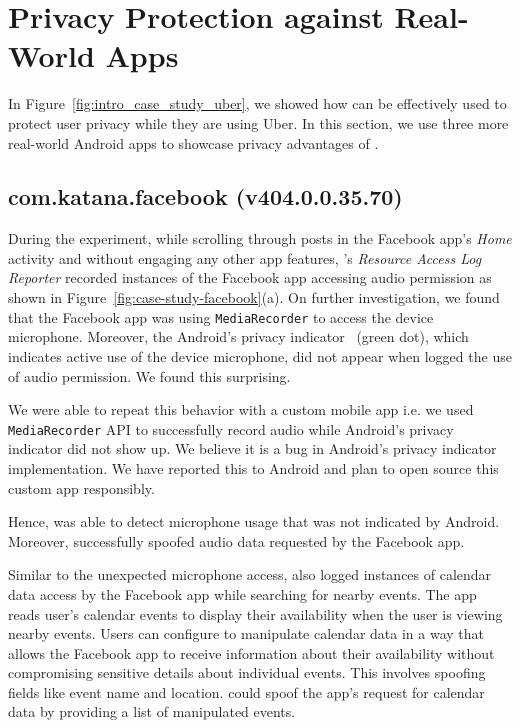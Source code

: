 \newpage
\section{Privacy Protection against Real-World Apps}
\label{sec:protecting_up}


In Figure~\ref{fig:intro_case_study_uber}, we showed how \framework{} can be effectively used to protect user privacy while they are using Uber. In this section, we use three more real-world Android apps to showcase privacy advantages of \framework{}.

\subsection{com.katana.facebook (v404.0.0.35.70)}
\label{sec:fb_case_study}
 
During the experiment, while scrolling through posts in the Facebook app's \textit{Home} activity and without engaging any other app features, \framework{}'s \textit{Resource Access Log Reporter} recorded instances of the Facebook app accessing audio permission as shown in Figure~\ref{fig:case-study-facebook}(a). On further investigation, we found that the Facebook app was using \texttt{MediaRecorder} to access the device microphone. Moreover, the Android's privacy indicator~\cite{andPrivacyIndicator} (green dot), which indicates active use of the device microphone, did not appear when \framework{} logged the use of audio permission. We found this surprising.

We were able to repeat this behavior with a custom mobile app i.e. we used \texttt{MediaRecorder} API to successfully record audio while Android's privacy indicator did not show up. We believe it is a bug in Android's privacy indicator implementation. We have reported this to Android and plan to open source this custom app responsibly.

Hence, \framework{} was able to detect microphone usage that was not indicated by Android. Moreover, \framework{} successfully spoofed audio data requested by the Facebook app. 

Similar to the unexpected microphone access, \framework{} also logged instances of calendar data access by the Facebook app while searching for nearby events. The app reads user's calendar events to display their availability when the user is viewing nearby events. Users can configure \framework{} to manipulate calendar data in a way that allows the Facebook app to receive information about their availability without compromising sensitive details about individual events. This involves spoofing fields like event name and location. \framework{} could spoof the app's request for calendar data by providing a list of manipulated events.

